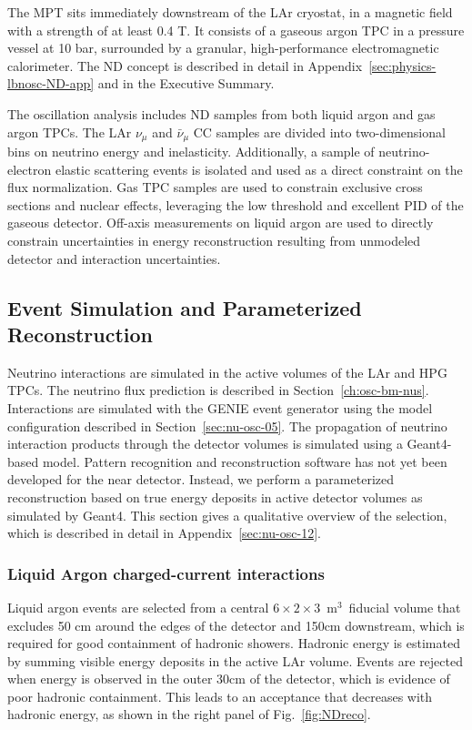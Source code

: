 The MPT sits immediately downstream of the LAr cryostat, in a magnetic field with a strength of at least 0.4 T. It consists of a gaseous argon TPC in a pressure vessel at 10 bar, surrounded by a granular, high-performance electromagnetic calorimeter. The ND concept is described in detail in Appendix~\ref{sec:physics-lbnosc-ND-app} and in the Executive Summary.

The oscillation analysis includes ND samples from both liquid argon and gas argon TPCs. The LAr $\nu_{\mu}$ and $\bar{\nu}_{\mu}$ CC samples are divided into two-dimensional bins on neutrino energy and inelasticity. Additionally, a sample of neutrino-electron elastic scattering events is isolated and used as a direct constraint on the flux normalization. Gas TPC samples are used to constrain exclusive cross sections and nuclear effects, leveraging the low threshold and excellent PID of the gaseous detector. Off-axis measurements on liquid argon are used to directly constrain uncertainties in energy reconstruction resulting from unmodeled detector and interaction uncertainties.

\subsection{Event Simulation and Parameterized Reconstruction}
\label{sec:ndsimreco}

Neutrino interactions are simulated in the active volumes of the LAr and HPG TPCs. The neutrino flux prediction is described in Section~\ref{ch:osc-bm-nus}. Interactions are simulated with the GENIE event generator using the model configuration described in Section~\ref{sec:nu-osc-05}. The propagation of neutrino interaction products through the detector volumes is simulated using a Geant4-based model. Pattern recognition and reconstruction software has not yet been developed for the near detector. Instead, we perform a parameterized reconstruction based on true energy deposits in active detector volumes as simulated by Geant4. This section gives a qualitative overview of the selection, which is described in detail in Appendix~\ref{sec:nu-osc-12}.

\subsubsection{Liquid Argon charged-current interactions}

Liquid argon events are selected from a central $6 \times 2 \times 3$~m$^{3}$~fiducial volume that excludes 50 cm around the edges of the detector and 150cm downstream, which is required for good containment of hadronic showers. Hadronic energy is estimated by summing visible energy deposits in the active LAr volume. Events are rejected when energy is observed in the outer 30cm of the detector, which is evidence of poor hadronic containment. This leads to an acceptance that decreases with hadronic energy, as shown in the right panel of Fig.~\ref{fig:NDreco}.

